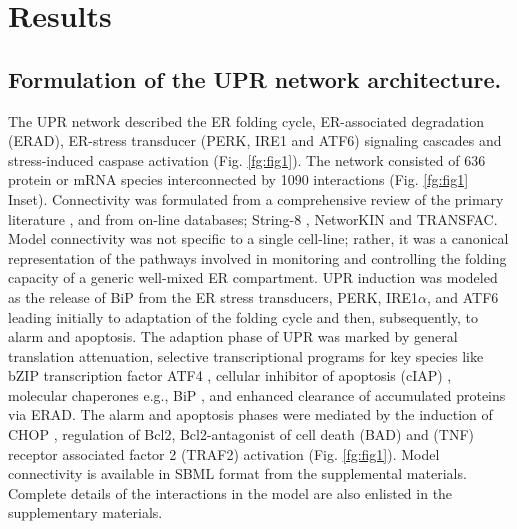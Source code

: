 \documentclass[fleqn,10pt]{wlscirep}
\begin{document}
\section*{Results}

\subsection*{Formulation of the UPR network architecture.}
The UPR network described the ER folding cycle, ER-associated degradation (ERAD), ER-stress transducer (PERK, IRE1 and ATF6) signaling cascades and stress-induced caspase activation (Fig. \ref{fg:fig1}). The network consisted of 636 protein or mRNA species interconnected by 1090 interactions (Fig. \ref{fg:fig1} Inset). Connectivity was formulated from a comprehensive review of the primary literature  \cite{naidoo2009er, ron2002translational, kaufman2002unfolded,ellgaard2003qce,Fonseca:2009fk,Schroder:2005vn,gotoh:hdc,mccullough2001gsc, belmont2008cga,Hetz:2009qc,Urano:2000uq,szegezdi2006mediators}, and from on-line databases; String-8 \cite{Jensen:2009fk}, NetworKIN \cite{Linding:2007fk} and TRANSFAC. Model connectivity was not specific to a single cell-line; rather, it was a canonical representation of the pathways involved in monitoring and controlling the folding capacity of a generic well-mixed ER compartment. UPR induction was modeled as the release of BiP from the ER stress transducers, PERK, IRE1$\alpha$, and ATF6 leading initially to adaptation of the folding cycle and then, subsequently, to alarm and apoptosis. The adaption phase of UPR was marked by general translation attenuation, selective transcriptional programs for key species like bZIP transcription factor ATF4 \cite{lu2004tra}, cellular inhibitor of apoptosis (cIAP) \cite{hamanaka2008pdr}, molecular chaperones e.g., BiP \cite{harding2003isr}, and enhanced clearance of accumulated proteins via ERAD. The alarm and apoptosis phases were mediated by the induction of CHOP \cite{ron1992cnd}, regulation of Bcl2, Bcl2-antagonist of cell death (BAD) \cite {wang1999cia} and (TNF) receptor associated factor 2 (TRAF2) \cite{lei2003jpb,putcha2003jmb, yamamoto1999bpa, szegezdi2006mediators} activation (Fig. \ref{fg:fig1}). 
Model connectivity is available in SBML format from the supplemental materials. Complete details of the interactions in the model are also enlisted in the supplementary materials.

\end{document}
